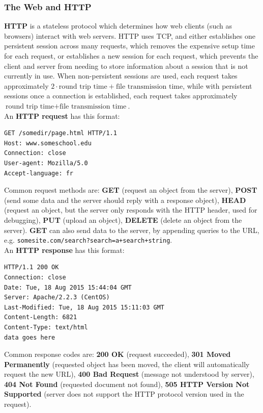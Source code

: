 \subsubsection{The Web and HTTP}
\textbf{HTTP} is a stateless protocol which determines how web clients (such as browsers) interact with web servers. HTTP uses TCP, and either establishes one persistent session across many requests, which removes the expensive setup time for each request, or establishes a new session for each request, which prevents the client and server from needing to store information about a session that is not currently in use. When non-persistent sessions are used, each request takes approximately $2\cdot\text{round trip time}+\text{file transmission time}$, while with persistent sessions once a connection is established, each request takes approximately $\text{round trip time}+\text{file transmission time}$.\\
An \textbf{HTTP request} has this format:\\
\begin{verbatim}
GET /somedir/page.html HTTP/1.1
Host: www.someschool.edu
Connection: close
User-agent: Mozilla/5.0
Accept-language: fr
\end{verbatim}
Common request methods are: \textbf{GET} (request an object from the server), \textbf{POST} (send some data and the server should reply with a response object), \textbf{HEAD} (request an object, but the server only responds with the HTTP header, used for debugging), \textbf{PUT} (upload an object), \textbf{DELETE} (delete an object from the server). \textbf{GET} can also send data to the server, by appending queries to the URL, e.g. \verb|somesite.com/search?search=a+search+string|.\\
An \textbf{HTTP response} has this format:\\
\begin{verbatim}
HTTP/1.1 200 OK
Connection: close
Date: Tue, 18 Aug 2015 15:44:04 GMT
Server: Apache/2.2.3 (CentOS)
Last-Modified: Tue, 18 Aug 2015 15:11:03 GMT
Content-Length: 6821
Content-Type: text/html
data goes here
\end{verbatim}
Common response codes are: \textbf{200 OK} (request succeeded), \textbf{301 Moved Permanently} (requested object has been moved, the client will automatically request the new URL), \textbf{400 Bad Request} (message not understood by server), \textbf{404 Not Found} (requested document not found), \textbf{505 HTTP Version Not Supported} (server does not support the HTTP protocol version used in the request).\\
